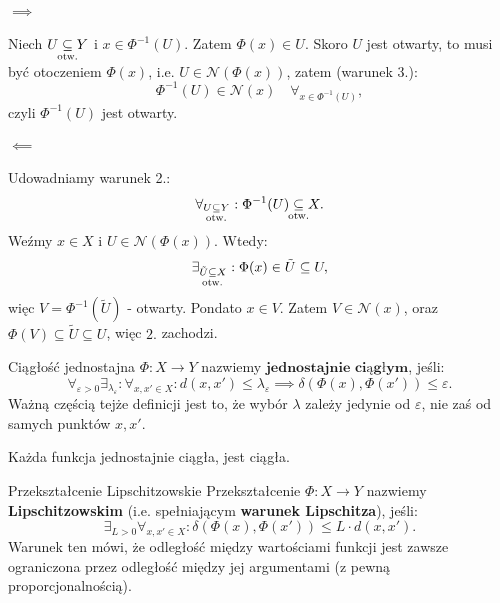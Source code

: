 \documentclass{article}
\newcounter{defi}
\numberwithin{defi}{section}
\numberwithin{defi}{section}
\newcommand{\Nau}{\mathcal{N}}
\newcommand{\subotw}{\underset{\clap{\scriptsize otw.}}{\subseteq}}
\providecommand{\eps}{\varepsilon}
\begin{document}
    \begin{dow}
        \paragraph{$\implies$} Niech $U \subotw Y$ i $x \in \Phi^{-1}(U)$. Zatem $\Phi(x) \in U$. Skoro $U$ jest otwarty, to musi być otoczeniem $\Phi(x)$, i.e. $U \in \Nau(\Phi(x))$, zatem (warunek 3.): \begin{equation*}
            \Phi^{-1}(U) \in \Nau(x) \quad \forall_{x \in \Phi^{-1}(U)},
        \end{equation*} czyli $\Phi^{-1}(U)$ jest otwarty.

        \paragraph{$\impliedby$} Udowadniamy warunek 2.:\begin{equation*}
            \forall_{U \subotw Y}: \Phi^{-1}(U) \subotw X.
        \end{equation*} Weźmy $x \in X$ i $U \in \Nau(\Phi(x))$. Wtedy: \begin{equation*}
            \exists_{\tilde{U} \subotw X}: \Phi(x) \in \tilde{U} \subseteq U,
        \end{equation*} więc $V = \Phi^{-1}(\tilde{U})$ - otwarty. Pondato $x \in V$. Zatem $V \in \Nau(x)$, oraz $\Phi(V) \subseteq \tilde{U} \subseteq U$, więc $2.$ zachodzi.
    \end{dow}


    \begin{defr} {Ciągłość jednostajna} \label{defr:ciaglosc-jednostajna}
        $\Phi: X \to Y$ nazwiemy $\textbf{jednostajnie ciągłym}$, jeśli: \begin{equation}
            \forall_{\eps > 0} \exists_{\lambda_\eps}: \forall_{x, x' \in X}: d(x, x') \leqslant \lambda_\eps \implies \delta(\Phi(x), \Phi(x')) \leqslant \eps.
        \end{equation}
        Ważną częścią tejże definicji jest to, że wybór $\lambda$ zależy jedynie od $\eps$, nie zaś od samych punktów $x, x'$.
    \end{defr} 

    \begin{obs}{}
        Każda funkcja jednostajnie ciągła, jest ciągła.
    \end{obs}

    \begin{defr}{Przekształcenie Lipschitzowskie}
        Przekształcenie $\Phi: X \to Y$ nazwiemy \textbf{Lipschitzowskim} (i.e. spełniającym \textbf{warunek Lipschitza}), jeśli:\begin{equation}
            \exists_{L > 0} \forall_{x, x' \in X}: \delta(\Phi(x), \Phi(x')) \leqslant L \cdot d(x, x').
        \end{equation} Warunek ten mówi, że odległość między wartościami funkcji jest zawsze ograniczona przez odległość między jej argumentami (z pewną proporcjonalnością).
    \end{defr}
\end{document}
